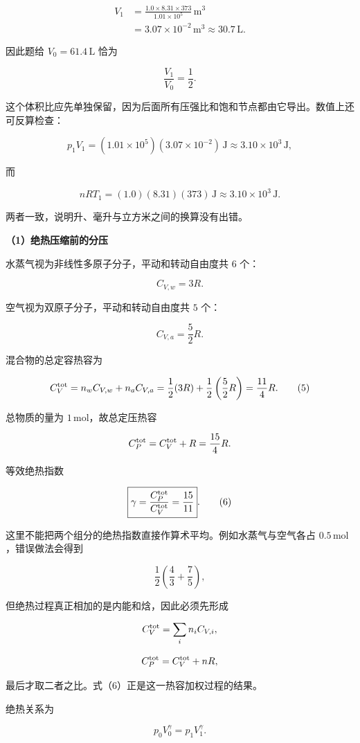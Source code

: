 \documentclass[12pt,a4paper,UTF8]{ctexart}
\begin{document}
\[\begin{aligned}
V_1
&=\frac{1.0\times8.31\times373}{1.01\times10^5}\,\mathrm{m^3}\\
&=3.07\times10^{-2}\,\mathrm{m^3}
\approx30.7\,\mathrm L.
\end{aligned} \tag{3}\]

因此题给 \(V_0=61.4\,\mathrm L\) 恰为

\[\frac{V_1}{V_0}=\frac12. \tag{4}\]

这个体积比应先单独保留，因为后面所有压强比和饱和节点都由它导出。数值上还可反算检查：

\[p_1V_1
=(1.01\times10^5)(3.07\times10^{-2})\,\mathrm J
\approx3.10\times10^3\,\mathrm J,\]

而

\[nRT_1
=(1.0)(8.31)(373)\,\mathrm J
\approx3.10\times10^3\,\mathrm J.\]

两者一致，说明升、毫升与立方米之间的换算没有出错。

\textbf{（1）绝热压缩前的分压}

水蒸气视为非线性多原子分子，平动和转动自由度共 \(6\) 个：

\[C_{V,w}=3R.\]

空气视为双原子分子，平动和转动自由度共 \(5\) 个：

\[C_{V,a}=\frac52R.\]

混合物的总定容热容为

\[C_V^{\rm tot}=n_wC_{V,w}+n_aC_{V,a}
=\frac12(3R)+\frac12\left(\frac52R\right)
=\frac{11}{4}R. \tag{5}\]

总物质的量为 \(1\,\mathrm{mol}\)，故总定压热容

\[C_P^{\rm tot}=C_V^{\rm tot}+R=\frac{15}{4}R.\]

等效绝热指数

\[\boxed{\gamma=\frac{C_P^{\rm tot}}{C_V^{\rm tot}}=\frac{15}{11}}. \tag{6}\]

这里不能把两个组分的绝热指数直接作算术平均。例如水蒸气与空气各占
\(0.5\,\mathrm{mol}\)，错误做法会得到

\[\frac12\left(\frac43+\frac75\right),\]

但绝热过程真正相加的是内能和焓，因此必须先形成

\[C_V^{\rm tot}=\sum_i n_iC_{V,i},\]

\[C_P^{\rm tot}=C_V^{\rm tot}+nR,\]

最后才取二者之比。式（6）正是这一热容加权过程的结果。

绝热关系为

\[p_0V_0^\gamma=p_1V_1^\gamma.\]
\end{document}
